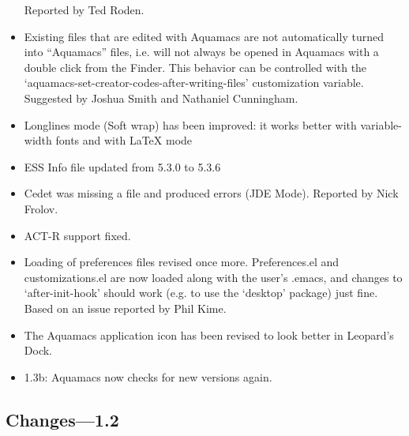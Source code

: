 \begin{itemize}
Reported by Ted Roden.
\item Existing files that are edited with Aquamacs are not automatically turned into ``Aquamacs'' files, i.e. will not always be opened in Aquamacs with a double click from the Finder. This behavior can be controlled with the `aquamacs-set-creator-codes-after-writing-files' customization variable.
Suggested by Joshua Smith and Nathaniel Cunningham.
\item Longlines mode (Soft wrap) has been improved: it works better with variable-width fonts and with LaTeX mode
\item ESS Info file updated from 5.3.0 to 5.3.6
\item Cedet was missing a file and produced errors (JDE
  Mode). Reported by Nick Frolov.
\item ACT-R support fixed.
\item Loading of preferences files revised once more.   Preferences.el and customizations.el are now loaded along   with the user's .emacs, and changes to `after-init-hook'   should work (e.g. to use the `desktop' package) just fine.   Based on an issue reported by Phil Kime.


\item The Aquamacs application icon has been revised to look better in Leopard's Dock.

\item 1.3b: Aquamacs now checks for new versions again.

\end{itemize}

\subsection{Changes---1.2}


